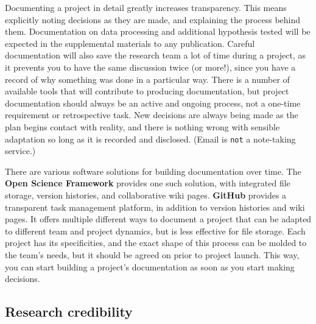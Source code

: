 Documenting a project in detail greatly increases transparency.
This means explicitly noting decisions as they are made, and explaining the process behind them.
Documentation on data processing and additional hypothesis tested will be expected in the supplemental materials to any publication.
Careful documentation will also save the research team a lot of time during a project,
as it prevents you to have the same discussion twice (or more!),
since you have a record of why something was done in a particular way.
There is a number of available tools
that will contribute to producing documentation,
but project documentation should always be an active and ongoing process,
not a one-time requirement or retrospective task.
New decisions are always being made as the plan begins contact with reality,
and there is nothing wrong with sensible adaptation so long as it is recorded and disclosed.
(Email is \texttt{not} a note-taking service.)

There are various software solutions for building documentation over time.
The \textbf{Open Science Framework} provides one such solution,
with integrated file storage, version histories, and collaborative wiki pages.
\textbf{GitHub} provides a transparent task management
platform,
in addition to version histories and wiki pages.
It offers multiple different ways to document a project that can be adapted to different team and project dynamics,
but is less effective for file storage.
Each project has its specificities,
and the exact shape of this process can be molded to the team's needs,
but it should be agreed on prior to project launch.
This way, you can start building a project's documentation as soon as you start making decisions.

\subsection{Research credibility}

